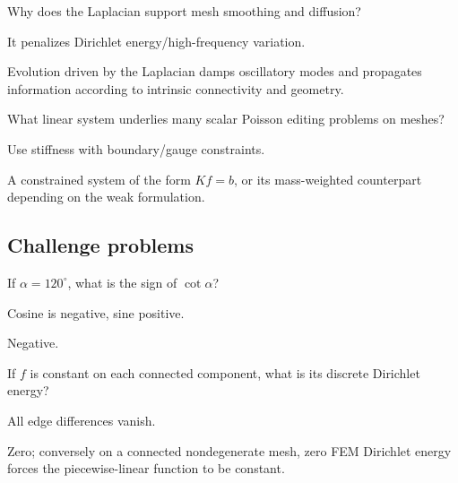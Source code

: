\begin{exercise}[Smoothing]\label{exr:vii41-ped-13}
Why does the Laplacian support mesh smoothing and diffusion?
\end{exercise}

\begin{hint}
It penalizes Dirichlet energy/high-frequency variation.
\end{hint}

\begin{solution}
Evolution driven by the Laplacian damps oscillatory modes and propagates information according to intrinsic connectivity and geometry.
\end{solution}

\begin{exercise}\label{exr:vii41-ped-14}
What linear system underlies many scalar Poisson editing problems on meshes?
\end{exercise}

\begin{hint}
Use stiffness with boundary/gauge constraints.
\end{hint}

\begin{solution}
A constrained system of the form \(Kf=b\), or its mass-weighted counterpart depending on the weak formulation.
\end{solution}

\subsection*{Challenge problems}

\begin{exercise}\label{exr:vii41-ped-15}
If \(\alpha=120^\circ\), what is the sign of \(\cot\alpha\)?
\end{exercise}

\begin{hint}
Cosine is negative, sine positive.
\end{hint}

\begin{solution}
Negative.
\end{solution}

\begin{exercise}\label{exr:vii41-ped-16}
If \(f\) is constant on each connected component, what is its discrete Dirichlet energy?
\end{exercise}

\begin{hint}
All edge differences vanish.
\end{hint}

\begin{solution}
Zero; conversely on a connected nondegenerate mesh, zero FEM Dirichlet energy forces the piecewise-linear function to be constant.
\end{solution}

